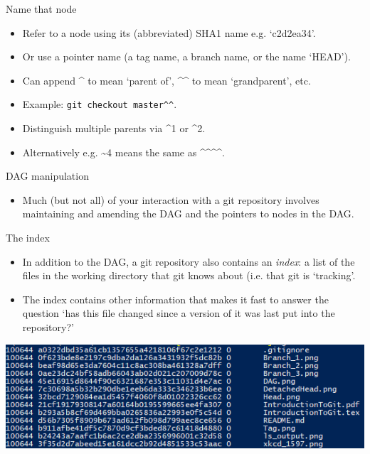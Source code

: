 \documentclass[usenames,dvipsnames]{beamer}
\newcommand{\code}[1]{\colorbox{light-gray}{\texttt{#1}}}
\begin{document}
\begin{frame}{Name that node}
  \begin{block}{}
    \begin{itemize}
      \item{Refer to a node using its (abbreviated) SHA1 name e.g. `c2d2ea34'.}
      \item{Or use a pointer name (a tag name, a branch name, or the name `HEAD').}
      \item{Can append \^{} to mean `parent of', \^{}\^{} to mean `grandparent', etc.}
      \item{Example: \code{git checkout master\^{}\^{}}.}
      \item{Distinguish multiple parents via \^{}1 or \^{}2.}
      \item{Alternatively e.g. \textasciitilde4 means the same as \^{}\^{}\^{}\^{}.}
    \end{itemize}
  \end{block}
\end{frame}

\begin{frame}{DAG manipulation}
  \begin{block}{}
    \begin{itemize}
      \item{Much (but not all) of your interaction with a git repository involves maintaining and amending the DAG and the pointers to nodes in the DAG.}
    \end{itemize}
  \end{block}
\end{frame}


\begin{frame}{The index}
  \begin{block}{}
    \begin{itemize}
      \item{In addition to the DAG, a git repository also contains an \textit{index}: a list of the files in the working directory that git knows about (i.e. that git is `tracking'.}
      \item{The index contains other information that makes it fast to answer the question `has this file changed since a version of it was last put into the repository?'}
    \end{itemize}
  \end{block}
  \begin{block}{}
    \begin{center}
      \includegraphics[scale=0.7]{Index.png}
    \end{center}
  \end{block}
\end{frame}
\end{document}
